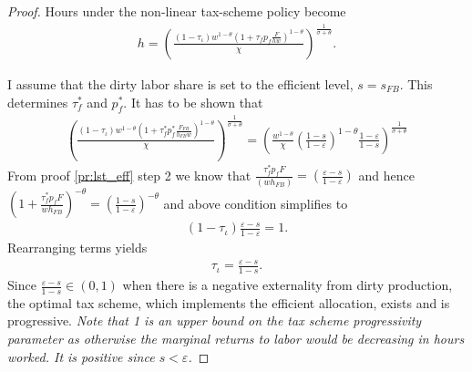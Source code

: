 \begin{proof}
	Hours under the non-linear tax-scheme policy become
	\begin{align}
	h=\left(\frac{(1-\tau_{\iota})w^{1-\theta}(1+\tau_f p_f\frac{F}{hw})^{1-\theta}}{\chi}\right)^\frac{1}{\sigma+\theta}.
	\end{align}
	
	I assume that the dirty labor share is set to the efficient level, $s=s_{FB}$. This determines $\tau^*_f$ and $p^*_f$.
	It has to be shown that
	\begin{align}
	\left(\frac{(1-\tau_{\iota})w^{1-\theta}\left(1+\tau^*_f p^*_f\frac{F_{FB}}{h_{FB}w}\right)^{1-\theta}}{\chi}\right)^\frac{1}{\sigma+\theta}=\left(\frac{w^{1-\theta}}{\chi}\left(\frac{1-s}{1-\varepsilon}\right)^{1-\theta}\frac{1-\varepsilon}{1-s}\right)^\frac{1}{\sigma+\theta}
	\end{align}
	From proof \ref{pr:lst_eff} step 2 we know that $\frac{\tau_f^*p_fF}{(wh_{FB})}=\left(\frac{\varepsilon-s}{1-\varepsilon}\right)$ and hence $\left(1+\frac{\tau_f^*p_fF}{wh_{FB}}\right)^{-\theta}=\left(\frac{1-s}{1-\varepsilon}\right)^{-\theta}$ and above condition simplifies to
	\begin{align}
	(1-\tau_{\iota})\frac{\varepsilon-s}{1-\varepsilon}=1.
	\end{align}
	Rearranging terms yields
	\begin{align}
	\tau_{\iota}= \frac{\varepsilon-s}{1-s}.
	\end{align}
	Since $\frac{\varepsilon-s}{1-s}\in(0,1)$ when there is a negative externality from dirty production, the optimal tax scheme, which implements the efficient allocation, exists and is progressive. \textit{Note that 1 is an upper bound on the tax scheme progressivity parameter as otherwise the marginal returns to labor would be decreasing in hours worked. It is positive since $s<\varepsilon$.}
\end{proof}

